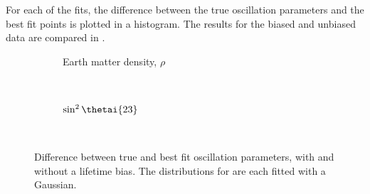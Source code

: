 For each of the fits, the difference between the true oscillation parameters and the best fit points is plotted in a histogram. 
The results for the biased and unbiased data are compared in .

\begin{figure}[h]
	\begin{subfigure}[t]{.49\textwidth}
		\begin{adjustbox}{max totalsize=\textwidth, center}
			
		\end{adjustbox}
		\caption{}
	\end{subfigure}
	\hfill
	\begin{subfigure}[t]{.49\textwidth}
		\begin{adjustbox}{max totalsize=\textwidth, center}
			
		\end{adjustbox}
		\caption{Earth matter density, $\rho$}
	\end{subfigure}
	\\
	\begin{subfigure}[t]{.49\textwidth}
		\begin{adjustbox}{max totalsize=\textwidth, center}
			
		\end{adjustbox}
		\caption{$\sin^{2} \thetai{23}$}
	\end{subfigure}
	\hfill
	\begin{subfigure}[t]{.49\textwidth}
		\begin{adjustbox}{max totalsize=\textwidth, center}
			
		\end{adjustbox}
		\caption{\dcp}
	\end{subfigure}	
	\\
	\centering
	\begin{subfigure}[t]{.5\textwidth}
		\begin{adjustbox}{max totalsize=\textwidth, center}
			
		\end{adjustbox}
		\caption{}
		\label{fig:paramComp5pc:dmsq32}
	\end{subfigure}
	\caption[Difference between true and best fit oscillation parameters, with and without a lifetime bias.]{Difference between true and best fit oscillation parameters, with and without a lifetime bias. The distributions for  are each fitted with a Gaussian.}
	\label{fig:paramComp5pc}
\end{figure}

